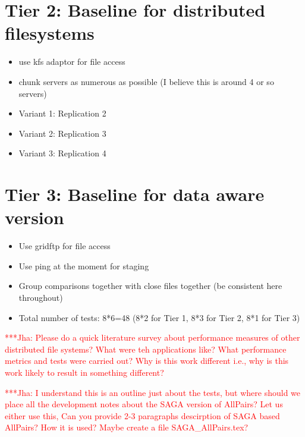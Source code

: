\documentclass[a4paper,12pt]{article}
\newcommand{\jhanote}[1]{ {\textcolor{red} { ***Jha: #1 }}}
\newcommand{\jhanote}[1]{}
\begin{document}
\section{Tier 2: Baseline for distributed filesystems}
\begin{itemize}
\item use kfs adaptor for file access
\item chunk servers as numerous as possible (I believe this is around 4 or so servers)
\item Variant 1: Replication 2
\item Variant 2: Replication 3
\item Variant 3: Replication 4
\end{itemize}

\section{Tier 3: Baseline for data aware version}
\begin{itemize}
\item Use gridftp for file access
\item Use ping at the moment for staging
\item Group comparisons together with close files together (be consistent here throughout)
\item Total number of tests: 8*6=48 (8*2 for Tier 1, 8*3 for Tier 2, 8*1 for Tier 3)
\end{itemize}

\jhanote{Please do a quick literature survey about performance measures
of other distributed file systems? What were teh applications like? What
performance metrics and tests were carried out? Why is this work 
different i.e., why is this work likely to result in something different?}

\jhanote{I understand this is an outline just about the tests, but where should we place all the development notes about the SAGA version of AllPairs? Let us either use this, Can you provide 2-3 paragraphs descirption of SAGA based AllPairs? How it is used? Maybe create a file SAGA\_AllPairs.tex? }
\end{document}
